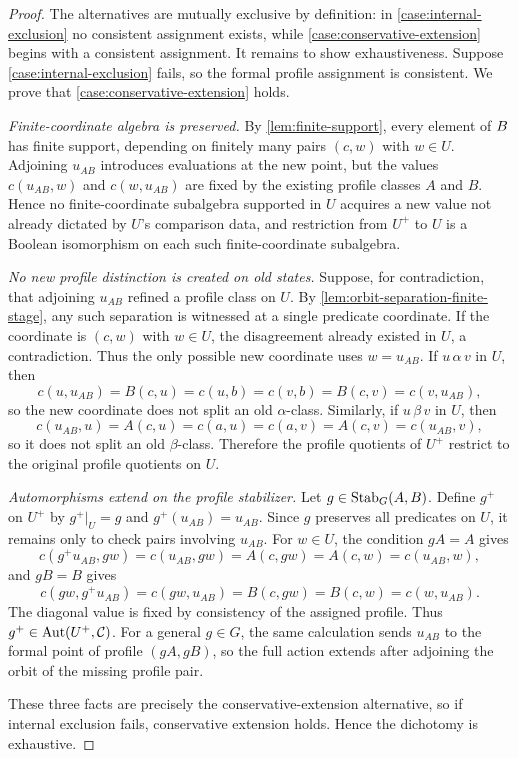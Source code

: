\begin{proof}
	The alternatives are mutually exclusive by definition: in
	\ref{case:internal-exclusion} no consistent assignment exists, while
	\ref{case:conservative-extension} begins with a consistent assignment.
	It remains to show exhaustiveness. Suppose
	\ref{case:internal-exclusion} fails, so the formal profile assignment is
	consistent. We prove that \ref{case:conservative-extension} holds.

	\emph{Finite-coordinate algebra is preserved.} By
	\cref{lem:finite-support}, every element of \(B\) has finite support,
	depending on finitely many pairs \((c,w)\) with \(w\in U\). Adjoining
	\(u_{AB}\) introduces evaluations at the new point, but the values
	\(c(u_{AB},w)\) and \(c(w,u_{AB})\) are fixed by the existing profile
	classes \(A\) and \(B\). Hence no finite-coordinate subalgebra supported
	in \(U\) acquires a new value not already dictated by \(U\)'s comparison
	data, and restriction from \(U^+\) to \(U\) is a Boolean isomorphism on
	each such finite-coordinate subalgebra.

	\emph{No new profile distinction is created on old states.} Suppose, for
	contradiction, that adjoining \(u_{AB}\) refined a profile class on
	\(U\). By \cref{lem:orbit-separation-finite-stage}, any such separation
	is witnessed at a single predicate coordinate. If the coordinate is
	\((c,w)\) with \(w\in U\), the disagreement already existed in \(U\), a
	contradiction. Thus the only possible new coordinate uses
	\(w=u_{AB}\). If \(u\,\alpha\,v\) in \(U\), then
	\[
		c(u,u_{AB})=B(c,u)=c(u,b)=c(v,b)=B(c,v)=c(v,u_{AB}),
	\]
	so the new coordinate does not split an old \(\alpha\)-class. Similarly,
	if \(u\,\beta\,v\) in \(U\), then
	\[
		c(u_{AB},u)=A(c,u)=c(a,u)=c(a,v)=A(c,v)=c(u_{AB},v),
	\]
	so it does not split an old \(\beta\)-class. Therefore the profile
	quotients of \(U^+\) restrict to the original profile quotients on
	\(U\).

	\emph{Automorphisms extend on the profile stabilizer.} Let
	\(g\in\operatorname{Stab}_G(A,B)\). Define \(g^+\) on \(U^+\) by
	\(g^+|_U=g\) and \(g^+(u_{AB})=u_{AB}\). Since \(g\) preserves all
	predicates on \(U\), it remains only to check pairs involving
	\(u_{AB}\). For \(w\in U\), the condition \(gA=A\) gives
	\[
		c(g^+u_{AB},gw)=c(u_{AB},gw)=A(c,gw)=A(c,w)=c(u_{AB},w),
	\]
	and \(gB=B\) gives
	\[
		c(gw,g^+u_{AB})=c(gw,u_{AB})=B(c,gw)=B(c,w)=c(w,u_{AB}).
	\]
	The diagonal value is fixed by consistency of the assigned profile.
	Thus \(g^+\in\operatorname{Aut}(U^+,\mathcal C)\). For a general \(g\in G\), the same
	calculation sends \(u_{AB}\) to the formal point of profile
	\((gA,gB)\), so the full action extends after adjoining the orbit of the
	missing profile pair.

	These three facts are precisely the conservative-extension alternative,
	so if internal exclusion fails, conservative extension holds. Hence the
	dichotomy is exhaustive.
\end{proof}
